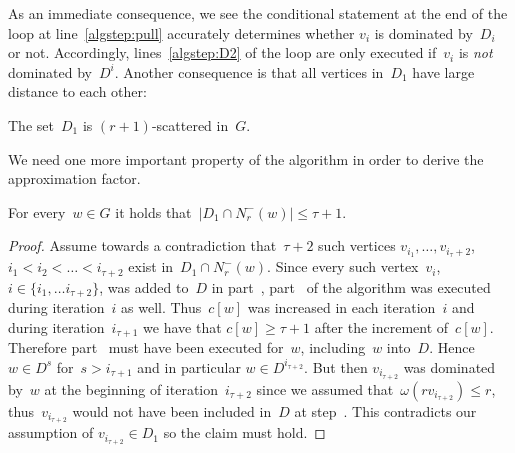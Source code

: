 \noindent
As an immediate consequence, we see the conditional statement at the end of
the loop at line~\ref{algstep:pull} accurately determines whether $v_i$ is
dominated by~$D_i$ or not. Accordingly, lines~\ref{algstep:D2}
of the loop are only executed if~$v_i$ is \emph{not} dominated by~$D^i$.
Another consequence is that all vertices in~$D_1$ have large distance to
each other:

\begin{corollary}
  The set~$D_1$ is $(r+1)$-scattered in~$G$.
\end{corollary}

\noindent
We need one more important property of the algorithm in order to derive
the approximation factor.

\begin{lemma}\label{lemma:D1-intersection}
  For every~$w \in G$ it holds that~$|D_1 \cap N^-_r(w)| \leq \tau+1$.
\end{lemma}
\begin{proof}
  Assume towards a contradiction that~$\tau+2$ such vertices
  $v_{i_1},\ldots,v_{i_\tau+2}$, $i_1 < i_2 < \ldots < i_{\tau+2}$ exist in~$D_1
  \cap N^-_r(w)$. Since every such vertex~$v_i$, $i \in \{i_1,\ldots
  i_{\tau+2}\}$, was added to~$D$ in part~, part~ of the
  algorithm was executed during iteration~$i$ as well. Thus~$c[w]$ was
  increased in each iteration~$i$ and during iteration~$i_{\tau+1}$ we have that
  $c[w] \geq \tau + 1$ after the increment of~$c[w]$. Therefore part~
  must have been executed for~$w$, including~$w$ into~$D$. Hence~$w \in D^s$
  for~$s > i_{\tau+1}$ and in particular $w \in D^{i_{\tau+2}}$. But then
  $v_{i_{\tau+2}}$ was dominated by~$w$ at the beginning of iteration~$i_{\tau+2}$
  since we assumed that~$\omega(rv_{i_{\tau+2}}) \leq r$, thus~$v_{i_{\tau+2}}$
  would not have been included in~$D$ at step~. This contradicts our
  assumption of $v_{i_{\tau+2}} \in D_1$ so the claim must hold.
\end{proof}


